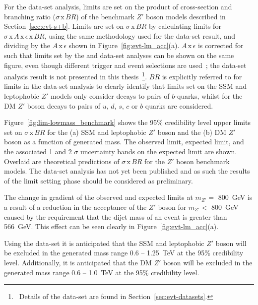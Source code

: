 For the \lm{} data-set analysis, limits are set on the product of cross-section and branching ratio ($\sigma\,\text{x}\,\mathit{BR}$)
of the benchmark $Z'$ boson models described in Section~\ref{sec:evt-s+b}.
Limits are set on $\sigma\,\text{x}\,\mathit{BR}$ by calculating limits for $\sigma\,\text{x}\,\mathit{A}\,\text{x}\,\epsilon\,\text{x}\,\mathit{BR}$,
using the same methodology used for the \summer{} data-set result,
and dividing by the $\mathit{A}\,\text{x}\,\epsilon$ shown in Figure~\ref{fig:evt-lm_acc}(a).
$\mathit{A}\,\text{x}\,\epsilon$ is corrected for such that limits set by the \lm{} and \hm{} data-set analyses can be shown on the same figure,
even though different trigger and event selections are used~\cite{dibjet-full_int}; the \hm{} data-set analysis result is not presented in this thesis~\footnote{\ Details
  of the \hm{} data-set are found in Section~\ref{sec:evt-datasets}.}.
$\mathit{BR}$ is explicitly referred to for limits in the \lm{} data-set analysis to clearly identify that
limits set on the SSM and leptophobic $Z'$ models only consider decays to pairs of $b$-quarks,
whilst for the DM $Z'$ boson decays to pairs of $u$, $d$, $s$, $c$ or $b$ quarks are considered.

Figure~\ref{fig:lim-lowmass_benchmark} shows the
95\% credibility level upper limits set on $\sigma\,\text{x}\,\mathit{BR}$
for the (a) SSM and leptophobic $Z'$ boson
and the (b)  DM $Z'$ boson as a function of generated mass.
The observed limit, expected limit, and the associated 1 and 2 $\sigma$ uncertainty bands on the expected limit are shown.
Overlaid are theoretical predictions of $\sigma\,\text{x}\,\mathit{BR}$ for the
$Z'$ boson benchmark models.
The \lm{} data-set analysis has not yet been published and as such the results of the limit setting phase should be considered as preliminary.

The change in gradient of the observed and expected limits at $m_{Z'} =$ 800~GeV
is a result of a reduction in the acceptance of the $Z'$ boson for $m_{Z'} <$ 800~GeV
caused by the requirement that the dijet mass of an event is greater than 566~GeV.
This effect can be seen clearly in Figure~\ref{fig:evt-lm_acc}(a).

Using the \lm{} data-set it is anticipated that the SSM and leptophobic $Z'$ boson
will be excluded in the generated mass range 0.6 -- 1.25~TeV at the 95\% credibility level.
Additionally, it is anticipated that the DM $Z'$ boson will be excluded in the generated mass range
0.6 -- 1.0~TeV  at the 95\% credibility level.

